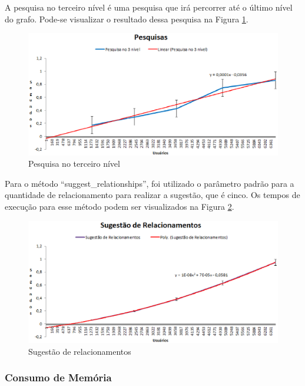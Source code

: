 A pesquisa no terceiro nível é uma pesquisa que irá percorrer até o último nível do grafo. Pode-se visualizar o resultado dessa pesquisa na Figura \ref{pesquisa_3}.

\begin{figure}[!h]
	\centering
	\includegraphics[scale=0.8]{figuras/resultados/graficos/pesquisa_3_nivel.eps}
	\caption[Pesquisas]{Pesquisa no terceiro nível}
	\label{pesquisa_3}
\end{figure}

Para o método ``suggest\_relationships'', foi utilizado o parâmetro padrão para a quantidade de relacionamento para realizar a sugestão, que é cinco. Os tempos de execução para esse método podem ser visualizados na Figura \ref{suggest}.

\begin{figure}[!h]
	\centering
	\includegraphics[scale=0.8]{figuras/resultados/graficos/sugestao_relacionamentos.eps}
	\caption[Sugestão de relacionamentos]{Sugestão de relacionamentos}
	\label{suggest}
\end{figure}

\subsubsection{Consumo de Memória}

